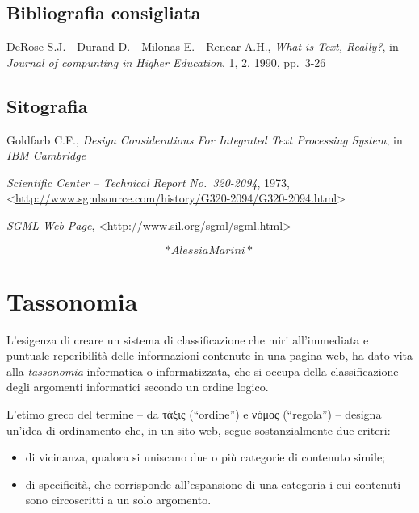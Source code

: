 \documentclass[
  b5paper,
  twoside,
  11pt,
  chapterprefix=false,
  bibliography=totocnumbered,
  parskip=0]{scrbook}
\begin{document}
\hypertarget{bibliografia-consigliata-23}{%
\section*{Bibliografia consigliata}\label{bibliografia-consigliata-23}}

DeRose S.J. - Durand D. - Milonas E. - Renear A.H., \emph{What is Text,
Really?}, in \emph{Journal of compunting in Higher Education}, 1, 2, 1990,
pp.~3-26

\hypertarget{sitografia-29}{%
\section*{Sitografia}\label{sitografia-29}}

Goldfarb C.F., \emph{Design Considerations For Integrated Text Processing
System}, in \emph{IBM Cambridge}

\emph{Scientific Center -- Technical Report} \emph{No.~320-2094}, 1973,
\textless{}\href{http://www.sgmlsource.com/history/G320-2094/G320-2094.html}{{http://www.sgmlsource.com/history/G320-2094/G320-2094.html}}\textgreater{}

\emph{SGML Web Page}, \textless{}{\url{http://www.sil.org/sgml/sgml.html}\textgreater{}}

\[*Alessia Marini*\]

\hypertarget{tassonomia}{%
\chapter{Tassonomia}\label{tassonomia}}

L'esigenza di creare un sistema di classificazione che miri
all'immediata e puntuale reperibilità delle informazioni contenute in
una pagina web, ha dato vita alla \emph{tassonomia} informatica o
informatizzata, che si occupa della classificazione degli argomenti
informatici secondo un ordine logico.

L'etimo greco del termine -- da τάξις (\enquote{ordine}) e νόμος (\enquote{regola}) --
designa un'idea di ordinamento che, in un sito web, segue
sostanzialmente due criteri:

\begin{itemize}
\item
  di vicinanza, qualora si uniscano due o più categorie di contenuto
  simile;
\item
  di specificità, che corrisponde all'espansione di una categoria i
  cui contenuti sono circoscritti a un solo argomento.
\end{itemize}
\end{document}
